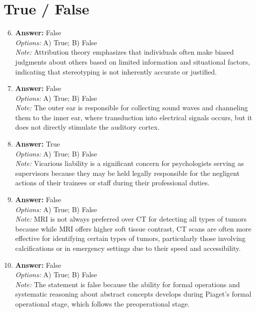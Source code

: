 \documentclass[12pt]{article}
\begin{document}
\section*{True / False}
\begin{enumerate}[label=\arabic*.]
\setcounter{enumi}{5}
\item \textbf{Answer:} False
\\ \textit{Options:} A) True; B) False
\\ \textit{Note:} Attribution theory emphasizes that individuals often make biased judgments about others based on limited information and situational factors, indicating that stereotyping is not inherently accurate or justified.
\item \textbf{Answer:} False
\\ \textit{Options:} A) True; B) False
\\ \textit{Note:} The outer ear is responsible for collecting sound waves and channeling them to the inner ear, where transduction into electrical signals occurs, but it does not directly stimulate the auditory cortex.
\item \textbf{Answer:} True
\\ \textit{Options:} A) True; B) False
\\ \textit{Note:} Vicarious liability is a significant concern for psychologists serving as supervisors because they may be held legally responsible for the negligent actions of their trainees or staff during their professional duties.
\item \textbf{Answer:} False
\\ \textit{Options:} A) True; B) False
\\ \textit{Note:} MRI is not always preferred over CT for detecting all types of tumors because while MRI offers higher soft tissue contrast, CT scans are often more effective for identifying certain types of tumors, particularly those involving calcifications or in emergency settings due to their speed and accessibility.
\item \textbf{Answer:} False
\\ \textit{Options:} A) True; B) False
\\ \textit{Note:} The statement is false because the ability for formal operations and systematic reasoning about abstract concepts develops during Piaget's formal operational stage, which follows the preoperational stage.
\end{enumerate}
\end{document}
